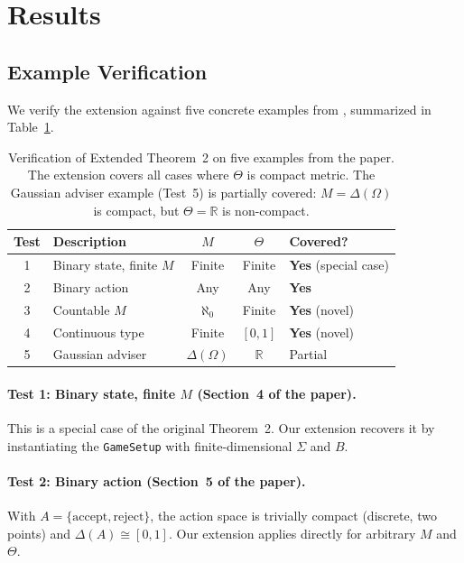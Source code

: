 \documentclass[11pt,a4paper]{article}
\theoremstyle{definition}
\newcommand{\R}{\mathbb{R}}
\newcommand{\DeltaA}{\Delta(A)}
\newcommand{\DeltaO}{\Delta(\Omega)}
\begin{document}
\section{Results}
\label{sec:results}

\subsection{Example Verification}

We verify the extension against five concrete examples from \citet{dworczak2026robust}, summarized in Table~\ref{tab:examples}.

\begin{table}[t]
\centering
\caption{Verification of Extended Theorem~2 on five examples from the paper.
The extension covers all cases where $\Theta$ is compact metric.
The Gaussian adviser example (Test~5) is partially covered: $M=\DeltaO$ is compact, but $\Theta=\R$ is non-compact.}
\label{tab:examples}
\begin{tabular}{@{}clccl@{}}
\toprule
\textbf{Test} & \textbf{Description} & \textbf{$M$} & \textbf{$\Theta$} & \textbf{Covered?} \\
\midrule
1 & Binary state, finite $M$   & Finite  & Finite  & \textbf{Yes} (special case) \\
2 & Binary action              & Any     & Any     & \textbf{Yes} \\
3 & Countable $M$              & $\aleph_0$ & Finite  & \textbf{Yes} (novel) \\
4 & Continuous type            & Finite  & $[0,1]$ & \textbf{Yes} (novel) \\
5 & Gaussian adviser           & $\DeltaO$ & $\R$  & Partial \\
\bottomrule
\end{tabular}
\end{table}

\paragraph{Test 1: Binary state, finite $M$ (Section~4 of the paper).}
This is a special case of the original Theorem~2.
Our extension recovers it by instantiating the \texttt{GameSetup} with finite-dimensional $\Sigma$ and $B$.

\paragraph{Test 2: Binary action (Section~5 of the paper).}
With $A=\{\text{accept},\text{reject}\}$, the action space is trivially compact (discrete, two points) and $\DeltaA\cong[0,1]$.
Our extension applies directly for arbitrary $M$ and $\Theta$.
\end{document}
